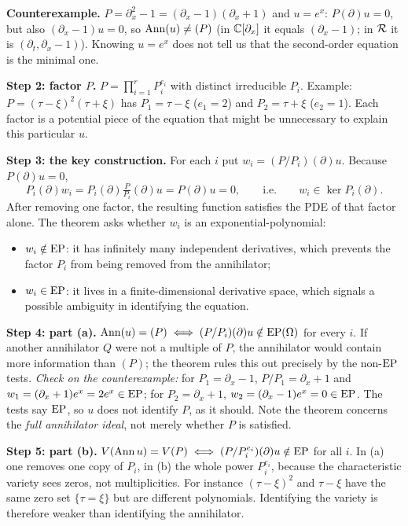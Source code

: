 \medskip\textbf{Counterexample.} $P=\partial_x^2-1=(\partial_x-1)(\partial_x+1)$ and $u=e^x$: $P(\partial)u=0$, but also $(\partial_x-1)u=0$, so $\operatorname{Ann}(u)\ne(P)$ (in $\mathbb{C}[\partial_x]$ it equals $(\partial_x-1)$; in $\mathcal{R}$ it is $(\partial_t,\partial_x-1)$). Knowing $u=e^x$ does not tell us that the second-order equation is the minimal one.

\medskip\textbf{Step 2: factor $P$.} $P=\prod_{i=1}^rP_i^{e_i}$ with distinct irreducible $P_i$. Example: $P=(\tau-\xi)^2(\tau+\xi)$ has $P_1=\tau-\xi$ ($e_1=2$) and $P_2=\tau+\xi$ ($e_2=1$). Each factor is a potential piece of the equation that might be unnecessary to explain this particular $u$.

\medskip\textbf{Step 3: the key construction.} For each $i$ put $w_i=(P/P_i)(\partial)u$. Because $P(\partial)u=0$,
\[
P_i(\partial)w_i=P_i(\partial)\tfrac{P}{P_i}(\partial)u=P(\partial)u=0,\qquad\text{i.e.}\qquad w_i\in\ker P_i(\partial).
\]
After removing one factor, the resulting function satisfies the PDE of that factor alone. The theorem asks whether $w_i$ is an exponential-polynomial:
\begin{itemize}[nosep]
\item $w_i\notin\mathrm{EP}$: it has infinitely many independent derivatives, which prevents the factor $P_i$ from being removed from the annihilator;
\item $w_i\in\mathrm{EP}$: it lives in a finite-dimensional derivative space, which signals a possible ambiguity in identifying the equation.
\end{itemize}

\medskip\textbf{Step 4: part (a).} $\operatorname{Ann}(u)=(P)\iff(P/P_i)(\partial)u\notin\mathrm{EP}(\Omega)$ for every $i$. If another annihilator $Q$ were not a multiple of $P$, the annihilator would contain more information than $(P)$; the theorem rules this out precisely by the non-$\mathrm{EP}$ tests. \emph{Check on the counterexample:} for $P_1=\partial_x-1$, $P/P_1=\partial_x+1$ and $w_1=(\partial_x+1)e^x=2e^x\in\mathrm{EP}$; for $P_2=\partial_x+1$, $w_2=(\partial_x-1)e^x=0\in\mathrm{EP}$. The tests say $\mathrm{EP}$, so $u$ does not identify $P$, as it should. Note the theorem concerns the \emph{full annihilator ideal}, not merely whether $P$ is satisfied.

\medskip\textbf{Step 5: part (b).} $V(\operatorname{Ann} u)=V(P)\iff(P/P_i^{e_i})(\partial)u\notin\mathrm{EP}$ for all $i$. In (a) one removes one copy of $P_i$, in (b) the whole power $P_i^{e_i}$, because the characteristic variety sees zeros, not multiplicities. For instance $(\tau-\xi)^2$ and $\tau-\xi$ have the same zero set $\{\tau=\xi\}$ but are different polynomials. Identifying the variety is therefore weaker than identifying the annihilator.

